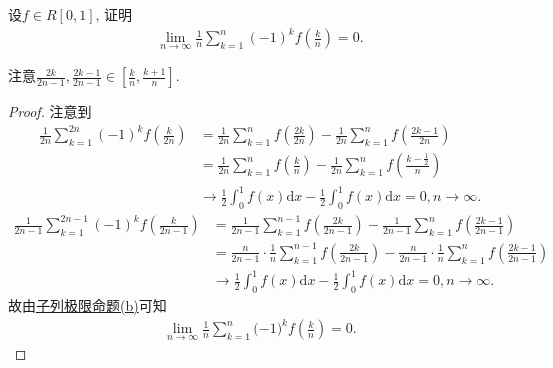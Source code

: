 \documentclass[../../main.tex]{subfiles}%
\begin{document}
\begin{example}
设$f \in R[0,1]$, 证明
\begin{align*}
\lim_{n \to \infty} \frac{1}{n} \sum_{k=1}^{n} (-1)^k f\left( \frac{k}{n} \right) = 0.
\end{align*}
\end{example}
\begin{note}
注意$\frac{2k}{2n-1},\frac{2k-1}{2n-1}\in \left[ \frac{k}{n},\frac{k+1}{n} \right]$.
\end{note}
\begin{proof}

注意到
\begin{align*}
\frac{1}{2n}\sum_{k=1}^{2n}{\left( -1 \right) ^kf\left( \frac{k}{2n} \right)}&=\frac{1}{2n}\sum_{k=1}^n{f\left( \frac{2k}{2n} \right)}-\frac{1}{2n}\sum_{k=1}^n{f\left( \frac{2k-1}{2n} \right)}\\
&=\frac{1}{2n}\sum_{k=1}^n{f\left( \frac{k}{n} \right)}-\frac{1}{2n}\sum_{k=1}^n{f\left( \frac{k-\frac{1}{2}}{n} \right)}\\
&\rightarrow \frac{1}{2}\int_0^1{f\left( x \right) \mathrm{d}x}-\frac{1}{2}\int_0^1{f\left( x \right) \mathrm{d}x}=0,n\rightarrow \infty .
\end{align*}
\begin{align*}
\frac{1}{2n-1}\sum_{k=1}^{2n-1}{\left( -1 \right) ^kf\left( \frac{k}{2n-1} \right)}&=\frac{1}{2n-1}\sum_{k=1}^{n-1}{f\left( \frac{2k}{2n-1} \right)}-\frac{1}{2n-1}\sum_{k=1}^n{f\left( \frac{2k-1}{2n-1} \right)}\\
&=\frac{n}{2n-1}\cdot \frac{1}{n}\sum_{k=1}^{n-1}{f\left( \frac{2k}{2n-1} \right)}-\frac{n}{2n-1}\cdot \frac{1}{n}\sum_{k=1}^n{f\left( \frac{2k-1}{2n-1} \right)}\\
&\rightarrow \frac{1}{2}\int_0^1{f\left( x \right) \mathrm{d}x}-\frac{1}{2}\int_0^1{f\left( x \right) \mathrm{d}x}=0,n\rightarrow \infty .
\end{align*}
故由\hyperref[proposition:子列极限命题]{子列极限命题(b)}可知
\begin{align*}
\lim_{n\rightarrow \infty} \frac{1}{n}\sum_{k=1}^n{(}-1)^kf\left( \frac{k}{n} \right) =0.
\end{align*}

\end{proof}
\end{document}
